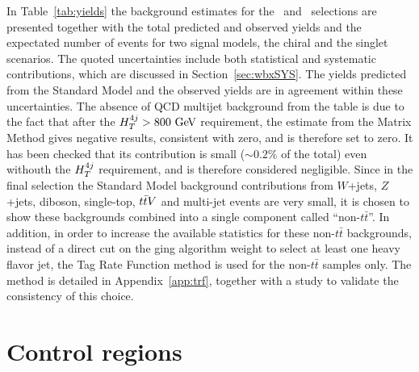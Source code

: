 In Table~\ref{tab:yields} the background estimates 
for the \loose\ and \tight\ selections are presented
together with the total predicted and observed yields
and the expectated number of events for two signal models, the
chiral and the singlet scenarios. 
The quoted uncertainties include both statistical and systematic contributions,
which are discussed in Section~\ref{sec:wbxSYS}.
The yields predicted from the Standard Model and the observed yields 
are in agreement within these uncertainties.
The absence of QCD multijet background from the table is due
to the fact that after the $\htfj>800\gev$ requirement, the estimate
from the Matrix Method gives negative results, consistent with zero,
and is therefore set to zero.
It has been checked that its contribution is small ($\sim 0.2\%$ of the total)
even withouth the $\htfj$ requirement, and is therefore considered negligible.
Since in the final selection the Standard Model background contributions
from $W$+jets, $Z$+jets, diboson, single-top, $\ttbar V$ and multi-jet events
are very small, it is chosen to show these backgrounds combined into a
single component called ``non-$t\bar{t}$''.
In addition, in order to increase the available statistics for these
non-$t\bar{t}$ backgrounds, instead of a direct cut on the \btag ging algorithm
weight to select at least one heavy flavor jet, the Tag Rate Function method
is used for the non-$t\bar{t}$ samples only. The method is detailed in 
Appendix~\ref{app:trf}, together with a study to validate the consistency
of this choice.




%



\section{Control regions}\label{sec:wbxCR}

